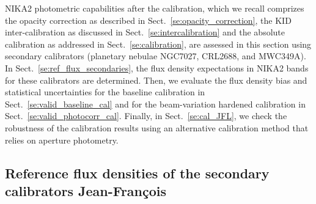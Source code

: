 

NIKA2 photometric capabilities after the calibration, which we recall
comprizes the opacity correction as described in
Sect.~\ref{se:opacity_correction}, the KID inter-calibration as discussed in
Sect.~\ref{se:intercalibration} and the absolute calibration as
addressed in Sect.~\ref{se:calibration}, are assessed in this section using
secondary calibrators (planetary nebulae NGC7027, CRL2688, and
MWC349A).
In Sect.~\ref{se:ref_flux_secondaries}, the flux density expectations
in NIKA2 bands for these calibrators are determined. Then, we evaluate
the flux density bias and statistical uncertainties for the baseline
calibration in Sect.~\ref{se:valid_baseline_cal} and for the
beam-variation hardened calibration in
Sect.~\ref{se:valid_photocorr_cal}. Finally, in
Sect.~\ref{se:cal_JFL}, we check the robustness of the calibration
results using an alternative calibration method that relies on
aperture photometry.


\subsection{Reference flux densities of the secondary calibrators {\color{blue} Jean-Fran\c cois}}

%
%


